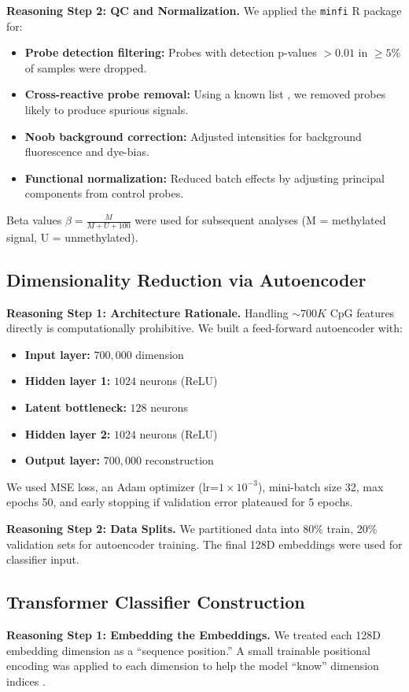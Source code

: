 \documentclass[journal]{IEEEtran}
\begin{document}
\textbf{Reasoning Step 2: QC and Normalization.}
We applied the \texttt{minfi} R package for:
\begin{itemize}[leftmargin=1em]
\item \textbf{Probe detection filtering:} Probes with detection p-values $>0.01$ in $\geq5\%$ of samples were dropped.
\item \textbf{Cross-reactive probe removal:} Using a known list \cite{Liu2016evaluation}, we removed probes likely to produce spurious signals.
\item \textbf{Noob background correction:} Adjusted intensities for background fluorescence and dye-bias.
\item \textbf{Functional normalization:} Reduced batch effects by adjusting principal components from control probes.
\end{itemize}
Beta values $\beta = \frac{M}{M+U+100}$ were used for subsequent analyses (M = methylated signal, U = unmethylated).

\subsection{Dimensionality Reduction via Autoencoder}
\textbf{Reasoning Step 1: Architecture Rationale.}
Handling $\sim700K$ CpG features directly is computationally prohibitive. We built a feed-forward autoencoder with:
\begin{itemize}[leftmargin=1em]
\item \textbf{Input layer:} $700{,}000$ dimension
\item \textbf{Hidden layer 1:} $1024$ neurons (ReLU)
\item \textbf{Latent bottleneck:} $128$ neurons
\item \textbf{Hidden layer 2:} $1024$ neurons (ReLU)
\item \textbf{Output layer:} $700{,}000$ reconstruction
\end{itemize}
We used MSE loss, an Adam optimizer (lr=$1\times10^{-3}$), mini-batch size 32, max epochs 50, and early stopping if validation error plateaued for 5 epochs.

\textbf{Reasoning Step 2: Data Splits.}
We partitioned data into 80\% train, 20\% validation sets for autoencoder training. The final 128D embeddings were used for classifier input.

\subsection{Transformer Classifier Construction}
\textbf{Reasoning Step 1: Embedding the Embeddings.}
We treated each 128D embedding dimension as a “sequence position.” A small trainable positional encoding was applied to each dimension to help the model “know” dimension indices \cite{Raushert2020machine}.
\end{document}
